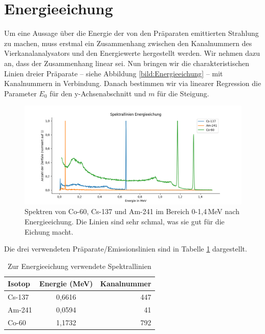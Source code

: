 \section{Energieeichung}
\label{section:Energieeichung}

Um eine Aussage über die Energie der von den Präparaten emittierten Strahlung zu machen, muss erstmal ein Zusammenhang zwischen 
den Kanalnummern des Vierkanalanalysators und den Energiewerte hergestellt werden. Wir nehmen dazu an, dass der Zusammenhang linear sei. Nun bringen wir 
die charakteristischen Linien dreier Präparate – siehe Abbildung \ref{bild:Energieeichung} – mit Kanalnummern in Verbindung. Danach bestimmen 
wir via linearer Regression die Parameter $E_0$  für den y-Achsenabschnitt und $m$ für die Steigung.\\

\begin{figure}[h]
    \centering
    \captionsetup{justification=centering,margin=1cm}
    \includegraphics[width = \linewidth]{Bilder/Auswertung/EnergieeichungLinien.png}
    \caption{Spektren von Co-60, Cs-137 und Am-241 im Bereich 0-1,4\,MeV nach Energieeichung. Die Linien sind sehr schmal, was sie gut für die Eichung macht.}
    \label{bild:EichungDrei}
\end{figure}




Die drei verwendeten Präparate/Emissionslinien  sind in Tabelle \ref{Eichung} dargestellt.
 \begin{table}[h]
    \centering
     \begin{tabular}{lcr}
        Isotop & Energie (MeV) & Kanalnummer \\
        \toprule
         Cs-137 & 0,6616  & 447\\
         Am-241 & 0,0594 & 41\\
         Co-60 & 1,1732 & 792\\
     \end{tabular}
     \caption{Zur Energieeichung verwendete Spektrallinien}
     \label{Eichung}
 \end{table}

